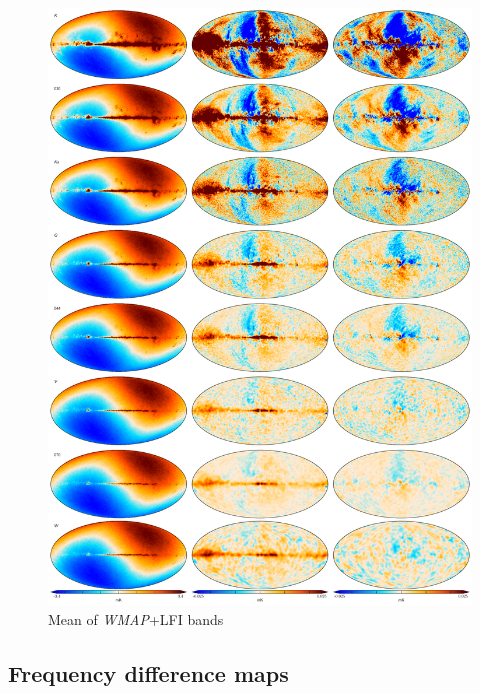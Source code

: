 \documentclass[twocolumn]{../../common/aa}
\begin{document}
\begin{figure}
	\centering
	\includegraphics[width=0.93\linewidth]{figures/megaplot.pdf}
	\caption{Mean of \textit{WMAP}+LFI bands}
\end{figure}

\subsection{Frequency difference maps}
\end{document}
